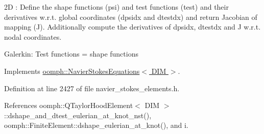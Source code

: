 2D \+: Define the shape functions (psi) and test functions (test) and their derivatives w.\+r.\+t. global coordinates (dpsidx and dtestdx) and return Jacobian of mapping (J). Additionally compute the derivatives of dpsidx, dtestdx and J w.\+r.\+t. nodal coordinates.

Galerkin\+: Test functions = shape functions 

Implements \hyperlink{classoomph_1_1NavierStokesEquations_afbc63afd804f5143c74b0ca1be76ef82}{oomph\+::\+Navier\+Stokes\+Equations$<$ D\+I\+M $>$}.



Definition at line 2427 of file navier\+\_\+stokes\+\_\+elements.\+h.



References oomph\+::\+Q\+Taylor\+Hood\+Element$<$ D\+I\+M $>$\+::dshape\+\_\+and\+\_\+dtest\+\_\+eulerian\+\_\+at\+\_\+knot\+\_\+nst(), oomph\+::\+Finite\+Element\+::dshape\+\_\+eulerian\+\_\+at\+\_\+knot(), and i.

\mbox{\label{classoomph_1_1QTaylorHoodElement_ad55f9bb30100dcc6b6b69eeec7cf4c06}} 
